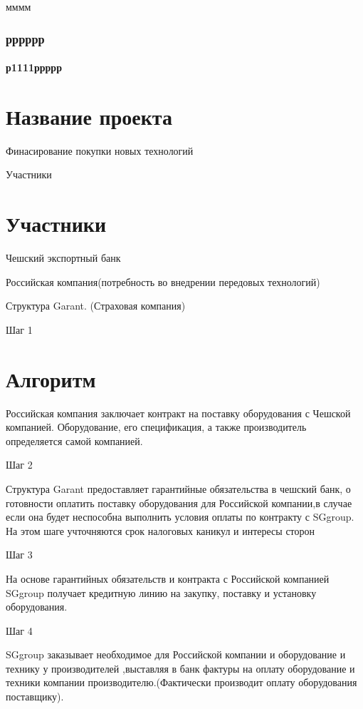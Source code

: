 \documentclass[russian]{beamer}
\author{D. Stefanovskiy}
\institute{RANE}
\date{lef,fff}
\begin{document}
\begin{frame}{мммм}
\frametitle{рррррр}
\framesubtitle{р1111ррррр}
\section{Название проекта}
Финасирование покупки новых технологий

\end{frame}

\begin{frame}{Участники}

\section{Участники}
Чешский экспортный банк

Российская компания(потребность во внедрении передовых технологий) 

Структура Garant. (Страховая компания)

\end{frame}

\begin{frame} {Шаг 1}
\section{Алгоритм}
Российская компания заключает контракт на поставку оборудования с
Чешской компанией. Оборудование, его спецификация, а также производитель
определяется самой компанией.

\end{frame}

\begin{frame} {Шаг 2}

Структура Garant предоставляет гарантийные обязательства в чешский
банк, о готовности оплатить поставку оборудования для Российской компании,в
случае если она будет неспособна выполнить условия оплаты по контракту
с SGgroup. На этом шаге учточняются срок налоговых каникул и интересы
сторон

\end{frame}

\begin{frame} {Шаг 3}

На основе гарантийных обязательств и контракта с Российской компанией
SGgroup получает кредитную линию на закупку, поставку и установку
оборудования. 

\end{frame}

\begin{frame} {Шаг 4}

SGgroup заказывает необходимое для Российской компании и оборудование
и технику у производителей ,выставляя в банк фактуры на оплату оборудование
и техники компании производителю.(Фактически производит оплату оборудования
поставщику). 

\end{frame}
\end{document}
